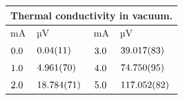 \begin{tabular}{|p{}|p{}||p{}|p{}|}
\hline
\multicolumn{4}{|c|}{Thermal conductivity in vacuum.}\\
\hline
mA&µV&mA&µV\\
\hline
$\num{0.0\pm 0.0}$&$\num{0.04\pm 0.11}$&$\num{3.0\pm 0.0}$&$\num{39.017\pm 0.083}$\\
$\num{1.0\pm 0.0}$&$\num{4.961\pm 0.07}$&$\num{4.0\pm 0.0}$&$\num{74.75\pm 0.095}$\\
$\num{2.0\pm 0.0}$&$\num{18.784\pm 0.071}$&$\num{5.0\pm 0.0}$&$\num{117.052\pm 0.082}$\\
\hline
\end{tabular}